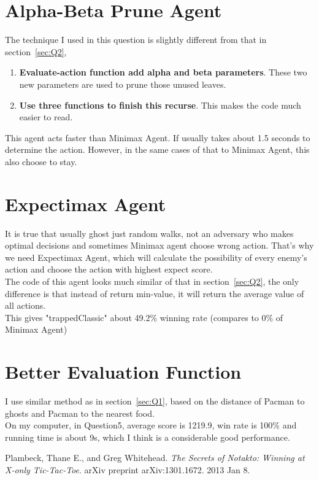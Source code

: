 \documentclass{article}
\begin{document}
	\section{Alpha-Beta Prune Agent}
	\label{sec:Q3}
	The technique I used in this question is slightly different from that in section~\ref{sec:Q2},
	\begin{enumerate}
		\item \textbf{Evaluate-action function add alpha and beta parameters}. These two new parameters are used to prune those unused leaves.
		\item \textbf{Use three functions to finish this recurse}. This makes the code much easier to read.
	\end{enumerate}
	This agent acts faster than Minimax Agent. If usually takes about 1.5 seconds to determine the action. However, in the same cases of that to Minimax Agent, this also choose to stay.
	\section{Expectimax Agent}
	\label{sec:Q4}
	It is true that usually ghost just random walks, not an adversary who makes optimal decisions and sometimes Minimax agent choose wrong action. That's why we need Expectimax Agent, which will calculate the possibility of every enemy's action and choose the action with highest expect score.\\
	The code of this agent looks much similar of that in section~\ref{sec:Q2}, the only difference is that instead of return min-value, it will return the average value of all actions.\\
	This gives "trappedClassic" about 49.2\% winning rate (compares to 0\% of Minimax Agent)
	\section{Better Evaluation Function}
	\label{sec:Q5}
	I use similar method as in section~\ref{sec:Q1}, based on the distance of Pacman to ghosts and Pacman to the nearest food.\\
	On my computer, in Question5, average score is 1219.9, win rate is 100\% and running time is about 9s, which I think is a considerable good performance.
	\begin{thebibliography}{1}
		Plambeck, Thane E., and Greg Whitehead. 
		\textit{The Secrets of Notakto: Winning at X-only Tic-Tac-Toe}. 
		arXiv preprint arXiv:1301.1672. 2013 Jan 8.
	\end{thebibliography}
\end{document}
